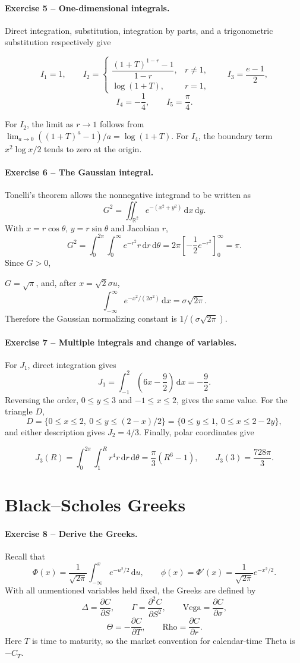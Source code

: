 \documentclass[10pt]{article}
\newcommand{\R}{\mathbb{R}}
\newcommand{\dd}{\,\mathrm{d}}
\newcommand{\solution}[1]{\begin{tcolorbox}[breakable,colback=ResultBlue!3,colframe=ResultBlue,
  boxrule=0.8pt,arc=1mm,title=\textbf{Result},fonttitle=\bfseries]#1\end{tcolorbox}}
\begin{document}
\paragraph{Exercise 5 -- One-dimensional integrals.}
Direct integration, substitution, integration by parts, and a trigonometric
substitution respectively give
\solution{\[
I_1=1,\qquad
I_2=\begin{cases}\dfrac{(1+T)^{1-r}-1}{1-r},&r\ne1,\\[4pt]
\log(1+T),&r=1,\end{cases}
\qquad I_3=\frac{e-1}{2},
\]
\[
I_4=-\frac14,\qquad I_5=\frac{\pi}{4}.
\]}
For $I_2$, the limit as $r\to1$ follows from
$\lim_{a\to0}((1+T)^a-1)/a=\log(1+T)$. For $I_4$, the boundary term
$x^2\log x/2$ tends to zero at the origin.

\paragraph{Exercise 6 -- The Gaussian integral.}
Tonelli's theorem allows the nonnegative integrand to be written as
\[
G^2=\iint_{\R^2}e^{-(x^2+y^2)}\dd x\dd y.
\]
With $x=r\cos\theta$, $y=r\sin\theta$ and Jacobian $r$,
\[
G^2=\int_0^{2\pi}\int_0^\infty e^{-r^2}r\dd r\dd\theta
=2\pi\left[-\frac12e^{-r^2}\right]_0^\infty=\pi.
\]
Since $G>0$,
\solution{$\displaystyle G=\sqrt\pi$, and, after $x=\sqrt2\sigma u$,
\[
\int_{-\infty}^{\infty}e^{-x^2/(2\sigma^2)}\dd x
=\sigma\sqrt{2\pi}.
\]
Therefore the Gaussian normalizing constant is
$1/(\sigma\sqrt{2\pi})$.}

\paragraph{Exercise 7 -- Multiple integrals and change of variables.}
For $J_1$, direct integration gives
\[
J_1=\int_{-1}^2\left(6x-\frac92\right)\dd x=-\frac92.
\]
Reversing the order, $0\le y\le3$ and $-1\le x\le2$, gives the same value.
For the triangle $D$,
\[
D=\{0\le x\le2,\ 0\le y\le(2-x)/2\}
=\{0\le y\le1,\ 0\le x\le2-2y\},
\]
and either description gives $J_2=4/3$. Finally, polar coordinates give
\solution{\[
J_3(R)=\int_0^{2\pi}\int_1^Rr^4r\dd r\dd\theta
=\frac{\pi}{3}(R^6-1),\qquad J_3(3)=\frac{728\pi}{3}.
\]}

\section{Black--Scholes Greeks}

\paragraph{Exercise 8 -- Derive the Greeks.}
Recall that
\[
\Phi(x)=\frac{1}{\sqrt{2\pi}}\int_{-\infty}^x e^{-u^2/2}\dd u,
\qquad
\phi(x)=\Phi'(x)=\frac{1}{\sqrt{2\pi}}e^{-x^2/2}.
\]
With all unmentioned variables held fixed, the Greeks are defined by
\[
\Delta=\frac{\partial C}{\partial S},\qquad
\Gamma=\frac{\partial^2 C}{\partial S^2},\qquad
\mathrm{Vega}=\frac{\partial C}{\partial\sigma},
\]
\[
\Theta=-\frac{\partial C}{\partial T},\qquad
\mathrm{Rho}=\frac{\partial C}{\partial r}.
\]
Here $T$ is time to maturity, so the market convention for calendar-time
Theta is $-C_T$.
\end{document}
